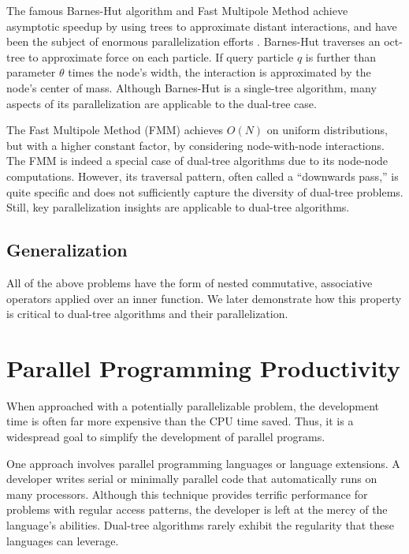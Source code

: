 \documentclass[twoside,leqno,twocolumn]{article}
\newcommand{\mysub}[1]{\subsection{#1} }
\begin{document}
The famous Barnes-Hut algorithm \cite{barnes_hut} and Fast Multipole Method \cite{greengard_fmm} achieve asymptotic speedup by using trees to approximate distant interactions, and have been the subject of enormous parallelization efforts \cite{singh_thesis, salmon_thesis, liu94experiences, salmon97parallel,singh92implications, singh95load, warren95portable}.
Barnes-Hut \cite{barnes_hut} traverses an oct-tree to approximate force on each particle.
If query particle $q$ is further than parameter $\theta$ times the node's width, the interaction is approximated by the node's center of mass.
Although Barnes-Hut is a single-tree algorithm, many aspects of its parallelization are applicable to the dual-tree case.

The Fast Multipole Method (FMM) \cite{greengard_fmm} achieves $O(N)$ on uniform distributions, but with a higher constant factor, by considering node-with-node interactions.
The FMM is indeed a special case of dual-tree algorithms due to its node-node computations.
However, its traversal pattern, often called a ``downwards pass,'' is quite specific and does not sufficiently capture the diversity of dual-tree problems.
Still, key parallelization insights are applicable to dual-tree algorithms.

\mysub{Generalization}
All of the above problems have the form of nested commutative, associative operators applied over an inner function.
We later demonstrate how this property is critical to dual-tree algorithms and their parallelization.


\section{Parallel Programming Productivity}

When approached with a potentially parallelizable problem, the development time is often far more expensive than the CPU time saved.
Thus, it is a widespread goal to simplify the development of parallel programs.

One approach involves parallel programming languages or language extensions.
A developer writes serial or minimally parallel code that automatically runs on many processors.
Although this technique provides terrific performance for problems with regular access patterns, the developer is left at the mercy of the language's abilities.
Dual-tree algorithms rarely exhibit the regularity that these languages can leverage.
\end{document}
